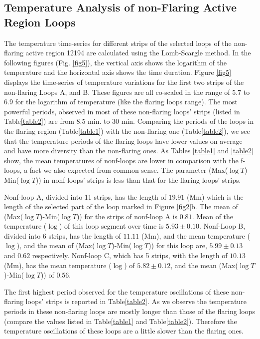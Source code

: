 \documentclass[oneside,onecolumn]{article}
\begin{document}
\subsection{Temperature Analysis of non-Flaring Active Region Loops}
The temperature time-series for different strips of the selected loops of the non-flaring active region 12194 are calculated using the Lomb-Scargle method. In the following figures (Fig. \ref{fig5}), the vertical axis shows the logarithm of the temperature and the horizontal axis shows the time duration. Figure \ref{fig5} displays the time-series of temperature variations for the first two strips of the non-flaring Loops A, and B. These figures are all co-scaled in the range of $5.7$ to $6.9$ for the logarithm of temperature (like the flaring loops range). The most powerful periods, observed in most of these non-flaring loops' strips (listed in Table\ref{table2}) are from $8.5$ min. to 30 min. Comparing the periods of the loops in the flaring region (Table\ref{table1}) with the non-flaring one (Table\ref{table2}), we see that the temperature periods of the flaring loops have lower values on average and have more diversity than the non-flaring ones. As Tables \ref{table1} and \ref{table2} show, the mean temperatures of nonf-loops are lower in comparison with the f-loops, a fact we also expected from common sense. The parameter (Max($\log{T}$)-Min($\log{T}$))  in nonf-loops' strips is less than that for the flaring loops' strips.  


Nonf-loop A, divided into 11 strips, has the length of $19.91$ (Mm) which is the length of the selected part of the loop marked in Figure \ref{fig2}b. The mean of (Max($\log{T}$)-Min($\log{T}$)) for the strips of nonf-loop A is $0.81$. Mean of the temperature ($\log$) of this loop segment over time is $5.93 \pm 0.10$. Nonf-Loop B, divided into 6 strips, has the length of $11.11$ (Mm), and the mean temperature ($\log$), and the mean of  (Max($\log{T}$)-Min($\log{T}$)) for this loop are, $5.99 \pm 0.13$ and $0.62$ respectively. Nonf-loop C, which has 5 strips, with the length of $10.13$ (Mm), has the mean temperature ($\log$) of $5.82 \pm 0.12$, and the mean (Max($\log{T}$)-Min($\log{T}$)) of $0.56$. 

The first highest period observed for the temperature oscillations of these non-flaring loops' strips is reported in Table\ref{table2}. As we observe the temperature periods in these non-flaring loops are mostly longer than those of the flaring loops (compare the values listed in Table\ref{table1} and Table\ref{table2}). Therefore the temperature oscillations of these loops are a little slower than the flaring ones. 
\end{document}
